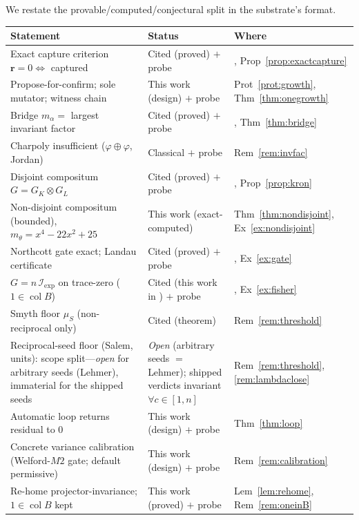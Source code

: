 \documentclass[11pt]{article}
\theoremstyle{plain}
\theoremstyle{definition}
\theoremstyle{remark}
\newcommand{\K}{K}
\newcommand{\Fish}{\mathcal{I}}
\newcommand{\rr}{\mathbf{r}}
\newcommand{\GG}{G}
\newcommand{\BB}{B}
\DeclareMathOperator{\col}{col}
\begin{document}
We restate the provable/computed/conjectural split in the substrate's format.

\begin{table}[ht]
\centering
\footnotesize
\begin{tabular}{p{} l l}
\toprule
Statement & Status & Where \\
\midrule
Exact capture criterion $\rr=0\iff$ captured & Cited (proved) $+$ probe & \cite{VectorSubstrate}, Prop~\ref{prop:exactcapture} \\
Propose-for-confirm; sole mutator; witness chain & This work (design) $+$ probe & Prot~\ref{prot:growth}, Thm~\ref{thm:onegrowth} \\
Bridge $m_\alpha=$ largest invariant factor & Cited (proved) $+$ probe & \cite{VectorSubstrate}, Thm~\ref{thm:bridge} \\
Charpoly insufficient ($\varphi\!\oplus\!\varphi$, Jordan) & Classical $+$ probe & Rem~\ref{rem:invfac} \\
Disjoint compositum $\GG=\GG_\K\otimes\GG_L$ & Cited (proved) $+$ probe & \cite{VectorSubstrate}, Prop~\ref{prop:kron} \\
Non-disjoint compositum (bounded), $m_\theta=x^4{-}22x^2{+}25$ & This work (exact-computed) & Thm~\ref{thm:nondisjoint}, Ex~\ref{ex:nondisjoint} \\
Northcott gate exact; Landau certificate & Cited (proved) $+$ probe & \cite{VectorSubstrate}, Ex~\ref{ex:gate} \\
$\GG=n\,\Fish_{\mathrm{exp}}$ on trace-zero ($1\in\col\BB$) & Cited (this work in \cite{VectorSubstrate}) $+$ probe & \cite{VectorSubstrate}, Ex~\ref{ex:fisher} \\
Smyth floor $\mu_S$ (non-reciprocal only) & Cited (theorem) & Rem~\ref{rem:threshold} \\
Reciprocal-seed floor (Salem, units): scope split---\emph{open} for arbitrary seeds (Lehmer), immaterial for the shipped seeds & \emph{Open} (arbitrary seeds $=$ Lehmer); shipped verdicts invariant $\forall c\in[1,n]$ & Rem~\ref{rem:threshold}, \ref{rem:lambdaclose} \\
Automatic loop returns residual to $0$ & This work (design) $+$ probe & Thm~\ref{thm:loop} \\
Concrete variance calibration (Welford-$M2$ gate; default permissive) & This work (design) $+$ probe & Rem~\ref{rem:calibration} \\
Re-home projector-invariance; $1\in\col\BB$ kept & This work (proved) $+$ probe & Lem~\ref{lem:rehome}, Rem~\ref{rem:oneinB} \\

\end{tabular}
\end{table}
\end{document}
